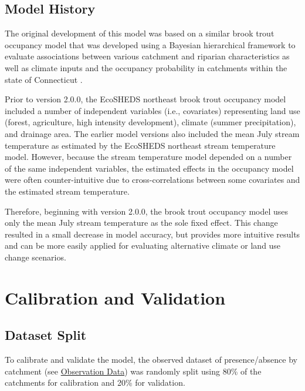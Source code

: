 \documentclass[
]{book}
\begin{document}
\hypertarget{model-history}{%
\section{Model History}\label{model-history}}

The original development of this model was based on a similar brook trout occupancy model that was developed using a Bayesian hierarchical framework to evaluate associations between various catchment and riparian characteristics as well as climate inputs and the occupancy probability in catchments within the state of Connecticut \citep{kanno2015}.

Prior to version 2.0.0, the EcoSHEDS northeast brook trout occupancy model included a number of independent variables (i.e., covariates) representing land use (forest, agriculture, high intensity development), climate (summer precipitation), and drainage area. The earlier model versions also included the mean July stream temperature as estimated by the EcoSHEDS northeast stream temperature model. However, because the stream temperature model depended on a number of the same independent variables, the estimated effects in the occupancy model were often counter-intuitive due to cross-correlations between some covariates and the estimated stream temperature.

Therefore, beginning with version 2.0.0, the brook trout occupancy model uses only the mean July stream temperature as the sole fixed effect. This change resulted in a small decrease in model accuracy, but provides more intuitive results and can be more easily applied for evaluating alternative climate or land use change scenarios.

\hypertarget{calibration-and-validation}{%
\chapter{Calibration and Validation}\label{calibration-and-validation}}

\hypertarget{dataset-split}{%
\section{Dataset Split}\label{dataset-split}}

To calibrate and validate the model, the observed dataset of presence/absence by catchment (see \protect\hyperlink{observation-data}{Observation Data}) was randomly split using 80\% of the catchments for calibration and 20\% for validation.
\end{document}

